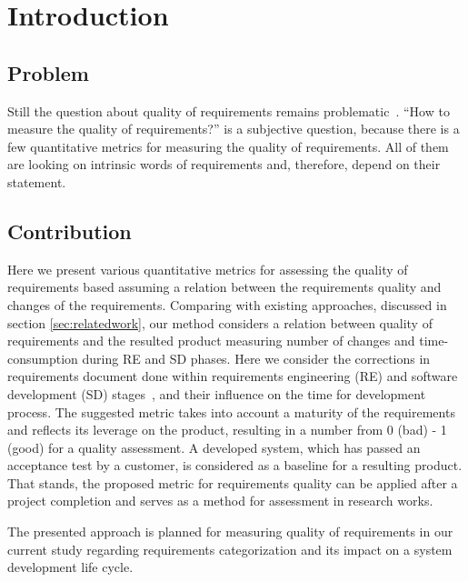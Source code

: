 \section{Introduction}
\label{sec:Intro} 

\subsection{Problem}
Still the question about quality of requirements remains problematic~\cite{Fernandez2016}. 
``How to measure the quality of requirements?'' is a subjective question, because 
there is a few quantitative metrics for measuring the quality of requirements. 
All of them are looking on intrinsic words of requirements and, therefore, depend on their statement.

\subsection{Contribution}
Here we present various quantitative metrics for assessing the quality of requirements based 
assuming a relation between the requirements quality and changes of the requirements. Comparing with existing approaches, 
discussed in section \autoref{sec:relatedwork}, our method considers a relation between quality of requirements and 
the resulted product measuring number of changes and time-consumption during RE and SD phases. Here we consider 
the corrections in requirements document done within requirements engineering (RE) and software development (SD) stages~\cite{FARBEY:1990}, 
and their influence on the time for development process. The suggested metric takes into account a maturity of the requirements 
and reflects its leverage on the product, resulting in a number from 0 (bad) - 1 (good) for a quality assessment. A developed system, 
which has passed an acceptance test by a customer, is considered as a baseline for a resulting product. That stands, the proposed metric 
for requirements quality can be applied after a project completion and serves as a method for assessment in research works. 

The presented approach is planned for measuring quality of requirements in our current study regarding requirements 
categorization and its impact on a system development life cycle.
